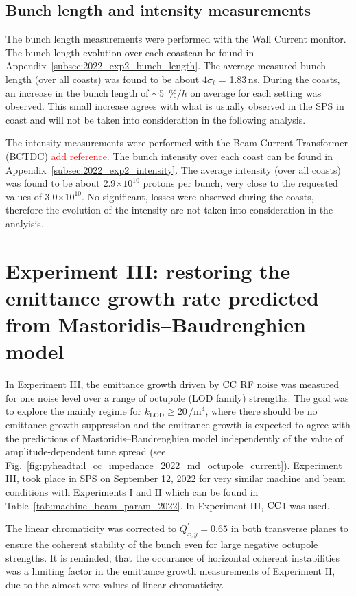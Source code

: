 \subsection{Bunch length and intensity measurements}\label{subsec:bunch_length_intensity_exp2}

The bunch length measurements were performed with the Wall Current monitor. The bunch length evolution over each coastcan be found in Appendix~\ref{subsec:2022_exp2_bunch_length}. The average measured bunch length (over all coasts) was found to be about $4\sigma_t$ = 1.83\,ns. During the coasts, an increase in the bunch length of $\sim$5~$\%/h$ on average for each setting was observed. This small increase agrees with what is usually observed in the SPS in coast and will not be taken into consideration in the following analysis. 


The intensity measurements were performed with the Beam Current Transformer (BCTDC) \textcolor{red}{add reference}. The bunch intensity over each coast can be found in Appendix~\ref{subsec:2022_exp2_intensity}. The average intensity (over all coasts) was found to be about 2.9$\times 10^{10}$ protons per bunch, very close to the requested values of 3.0$\times 10^{10}$. No significant, losses were observed during the coasts, therefore the evolution of the intensity are not taken into consideration in the analyisis.


\section{Experiment III: restoring the emittance growth rate predicted from Mastoridis--Baudrenghien model}\label{subsec:cc_md_sep_2022_octupole_scan}

In Experiment III, the emittance growth driven by ${\mathrm{CC}}$ RF noise was measured for one noise level over a range of octupole (LOD family) strengths. The goal was to explore the mainly regime for $k_\mathrm{LOD} \geq 20$\,$\mathrm{/m^4}$, where there should be no emittance growth suppression and the emittance growth is expected to agree with the predictions of Mastoridis--Baudrenghien model independently of the value of amplitude-dependent tune spread (see Fig.~\ref{fig:pyheadtail_cc_impedance_2022_md_octupole_current}). Experiment III, took place in SPS on September 12, 2022 for very similar machine and beam conditions with Experiments I and II which can be found in Table~\ref{tab:machine_beam_param_2022}. In Experiment III, ${\mathrm{CC}}$1 was used.

The linear chromaticity was corrected to $Q^\prime_{x,y}=0.65$ in both transverse planes to ensure the coherent stability of the bunch even for large negative octupole strengths. It is reminded, that the occurance of horizontal coherent instabilities was a limiting factor in the emittance growth measurements of Experiment II, due to the almost zero values of linear chromaticity.


